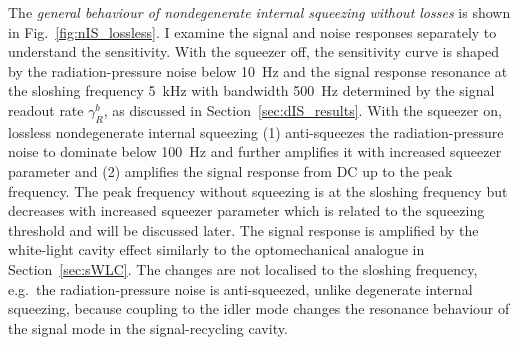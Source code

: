 The \emph{general behaviour of nondegenerate internal squeezing without losses} is shown in Fig.~\ref{fig:nIS_lossless}. I examine the signal and noise responses separately to understand the sensitivity.
With the squeezer off, the sensitivity curve is shaped by the radiation-pressure noise below 10~Hz and the signal response resonance at the sloshing frequency 5~kHz with bandwidth 500~Hz determined by the signal readout rate $\gamma^b_R$, as discussed in Section~\ref{sec:dIS_results}.
With the squeezer on, lossless nondegenerate internal squeezing (1) anti-squeezes the radiation-pressure noise to dominate below 100~Hz and further amplifies it with increased squeezer parameter and (2) amplifies the signal response from DC up to the peak frequency. The peak frequency without squeezing is at the sloshing frequency but decreases with increased squeezer parameter which is related to the squeezing threshold and will be discussed later.
The signal response is amplified by the white-light cavity effect similarly to the optomechanical analogue in Section~\ref{sec:sWLC}. %
The changes are not localised to the sloshing frequency, e.g.\ the radiation-pressure noise is anti-squeezed, unlike degenerate internal squeezing, because coupling to the idler mode changes the resonance behaviour of the signal mode in the signal-recycling cavity.


\label{sec:nIS_general_behaviour}

